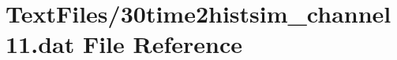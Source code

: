 \hypertarget{30time2histsim__channel11_8dat}{}\section{Text\+Files/30time2histsim\+\_\+channel11.dat File Reference}
\label{30time2histsim__channel11_8dat}
